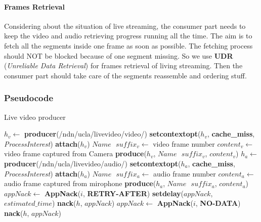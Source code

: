 \paragraph{Frames Retrieval} 
Considering about the situation of live streaming, the consumer part needs to keep the video and audio retrieving progress running all the time. The aim is to fetch all the segments inside one frame as soon as possible. The fetching process should NOT be blocked because of one segment missing. So we use \textbf{UDR} (\textit{Unreliable Data Retrieval}) for frames retrieval of living streaming. Then the consumer part should take care of the segments reassemble and ordering stuff.

\subsubsection{Pseudocode}

\begin{algorithm}%
\caption{Live video producer}
\label{alg:liveproducer}
\begin{algorithmic}[1]
\State $h_v \leftarrow $ \textbf{producer}(/ndn/ucla/livevideo/video/)
\State \textbf{setcontextopt}($h_v$, \textbf{cache\_miss}, \textit{ProcessInterest})
\State \textbf{attach}($h_v$)
\vspace{0.2cm}
	\State $Name \textbf{ } suffix_v \leftarrow $ video frame number
	\State $content_v \leftarrow $ video frame captured from Camera
	\State \textbf{produce}($h_v$, $Name\textbf{ }suffix_v$, $content_v$)
	\EndWhile
\vspace{0.2cm}
\vspace{0.2cm}
\State $h_a \leftarrow $ \textbf{producer}(/ndn/ucla/livevideo/audio/)
\State \textbf{setcontextopt}($h_a$, \textbf{cache\_miss}, \textit{ProcessInterest})
\State \textbf{attach}($h_a$)
\vspace{0.2cm}
	\State $Name \textbf{ } suffix_a \leftarrow $ audio frame number
	\State $content_a \leftarrow $ audio frame captured from mirophone
	\State \textbf{produce}($h_a$, $Name\textbf{ }suffix_a$, $content_a$)
	\EndWhile
\vspace{0.4cm}
    \State $appNack \leftarrow $ \textbf{AppNack}($i$, \textbf{RETRY-AFTER})
    \State \textbf{setdelay}($appNack$, $estimated\_time$)
    \State \textbf{nack}($h$, $appNack$)
  \EndIf
    \State $appNack \leftarrow $ \textbf{AppNack}($i$, \textbf{NO-DATA})
    \State \textbf{nack}($h$, $appNack$)
  \EndIf
\EndFunction
\end{algorithmic}
\end{algorithm}

